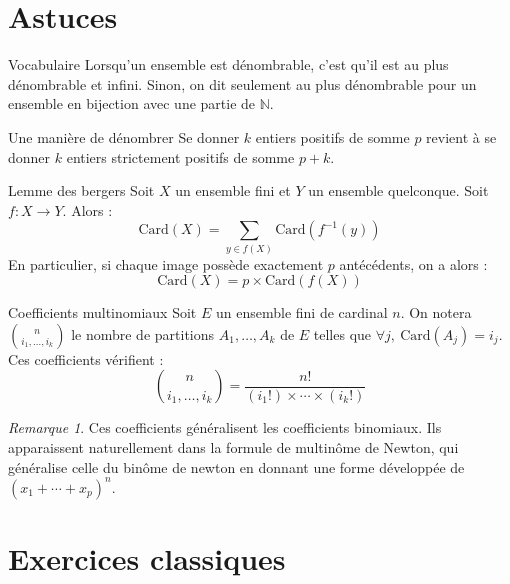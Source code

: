 \documentclass[french]{book}
\newcommand{\N}{\mathbb{N}}
\newcommand{\inv}{^{-1}}
\newcommand{\card}{\text{Card}}
\theoremstyle{plain}
\theoremstyle{definition}
\theoremstyle{remark}
\newtheorem*{rmq}{Remarque}
\begin{document}
\section{Astuces}
\begin{AS}{Vocabulaire} Lorsqu'un ensemble est dénombrable, c'est qu'il est au plus dénombrable et infini. Sinon, on dit seulement au plus dénombrable pour un ensemble en bijection avec une partie de $\N$.
\end{AS}
\begin{AS}{Une manière de dénombrer}
	Se donner $k$ entiers positifs de somme $p$ revient à se donner $k$ entiers strictement positifs de somme $p+k$.
\end{AS}
\begin{AS}{Lemme des bergers}
	Soit $X$ un ensemble fini et $Y$ un ensemble quelconque. Soit $f:X\to Y$. Alors : $$\card(X)=\sum_{y\in f(X)}\card(f\inv({y}))$$ En particulier, si chaque image possède exactement $p$ antécédents, on a alors : $$\card(X)=p\times\card(f(X))$$
\end{AS}
\begin{AS}{Coefficients multinomiaux}
	Soit $E$ un ensemble fini de cardinal $n$. On notera $\displaystyle\binom{n}{i_1,\ldots,i_k}$ le nombre de partitions $A_1,\ldots,A_k$ de $E$ telles que $\forall j,\ \card(A_j)=i_j$. Ces coefficients vérifient : $$\binom{n}{i_1,\ldots,i_k}=\frac{n!}{(i_1!)\times\cdots\times(i_k!)}$$
\end{AS}
\begin{rmq}
	Ces coefficients généralisent les coefficients binomiaux. Ils apparaissent naturellement dans la formule de multinôme de Newton, qui généralise celle du binôme de newton en donnant une forme développée de $(x_1+\cdots+x_p)^n$.
\end{rmq}

\section{Exercices classiques}
\end{document}
